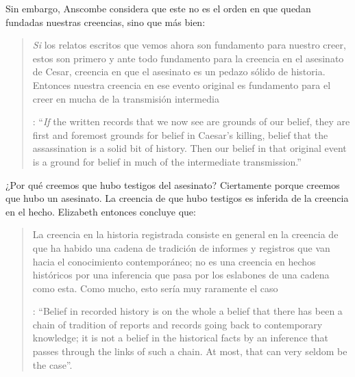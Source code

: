 \label{subsec:notchain}
Sin embargo, Anscombe considera que este no es el orden en que quedan fundadas nuestras creencias, sino que más bien: \blockquote[{\Cite[88]{anscombe1981parmenides:humeandjulius}}: \enquote{\emph{If} the written records that we now see are grounds of our belief, they are first and foremost grounds for belief in Caesar's killing, belief that the assassination is a solid bit of history. Then our belief in that original event is a ground for belief in much of the intermediate transmission.}]{\emph{Si} los relatos escritos que vemos ahora son fundamento para nuestro creer, estos son primero y ante todo fundamento para la creencia en el asesinato de Cesar, creencia en que el asesinato es un pedazo sólido de historia. Entonces nuestra creencia en ese evento original es fundamento para el creer en mucha de la transmisión intermedia}. ¿Por qué creemos que hubo testigos del asesinato? Ciertamente porque creemos que hubo un asesinato. La creencia de que hubo testigos es inferida de la creencia en el hecho.
Elizabeth entonces concluye que: \blockquote[{\Cite[89]{anscombe1981parmenides:humeandjulius}}: \enquote{Belief in recorded history is on the whole a belief that there has been a chain of tradition of reports and records going back to contemporary knowledge; it is not a belief in the historical facts by an inference that passes through the links of such a chain. At most, that can very seldom be the case}.]{La creencia en la historia registrada consiste en general en la creencia de que ha habido una cadena de tradición de informes y registros que van hacia el conocimiento contemporáneo; no es una creencia en hechos históricos por una inferencia que pasa por los eslabones de una cadena como esta. Como mucho, esto sería muy raramente el caso}.



